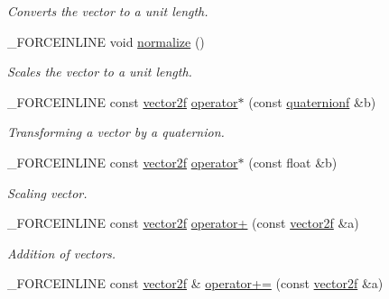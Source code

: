 \begin{DoxyCompactItemize}
\begin{DoxyCompactList}\small\item\em Converts the vector to a unit length. \end{DoxyCompactList}\item 
\hypertarget{classbt_1_1vector2f_aefdfbe4a6dcecf8a2443aa914f344a04}{\-\_\-\-F\-O\-R\-C\-E\-I\-N\-L\-I\-N\-E void \hyperlink{classbt_1_1vector2f_aefdfbe4a6dcecf8a2443aa914f344a04}{normalize} ()}\label{classbt_1_1vector2f_aefdfbe4a6dcecf8a2443aa914f344a04}

\begin{DoxyCompactList}\small\item\em Scales the vector to a unit length. \end{DoxyCompactList}\item 
\hypertarget{classbt_1_1vector2f_a381ee7f7b1b027682ee0708d9aaf08d7}{\-\_\-\-F\-O\-R\-C\-E\-I\-N\-L\-I\-N\-E const \hyperlink{classbt_1_1vector2f}{vector2f} \hyperlink{classbt_1_1vector2f_a381ee7f7b1b027682ee0708d9aaf08d7}{operator$\ast$} (const \hyperlink{classbt_1_1quaternionf}{quaternionf} \&b)}\label{classbt_1_1vector2f_a381ee7f7b1b027682ee0708d9aaf08d7}

\begin{DoxyCompactList}\small\item\em Transforming a vector by a quaternion. \end{DoxyCompactList}\item 
\hypertarget{classbt_1_1vector2f_aa389b9e307ab16ba50c1c1b885a4b498}{\-\_\-\-F\-O\-R\-C\-E\-I\-N\-L\-I\-N\-E const \hyperlink{classbt_1_1vector2f}{vector2f} \hyperlink{classbt_1_1vector2f_aa389b9e307ab16ba50c1c1b885a4b498}{operator$\ast$} (const float \&b)}\label{classbt_1_1vector2f_aa389b9e307ab16ba50c1c1b885a4b498}

\begin{DoxyCompactList}\small\item\em Scaling vector. \end{DoxyCompactList}\item 
\hypertarget{classbt_1_1vector2f_a1b2a8cfec3fa8a59348a8c1b663931c3}{\-\_\-\-F\-O\-R\-C\-E\-I\-N\-L\-I\-N\-E const \hyperlink{classbt_1_1vector2f}{vector2f} \hyperlink{classbt_1_1vector2f_a1b2a8cfec3fa8a59348a8c1b663931c3}{operator+} (const \hyperlink{classbt_1_1vector2f}{vector2f} \&a)}\label{classbt_1_1vector2f_a1b2a8cfec3fa8a59348a8c1b663931c3}

\begin{DoxyCompactList}\small\item\em Addition of vectors. \end{DoxyCompactList}\item 
\hypertarget{classbt_1_1vector2f_af8e2c98742a3ac873f4c0269a0ce1762}{\-\_\-\-F\-O\-R\-C\-E\-I\-N\-L\-I\-N\-E const \hyperlink{classbt_1_1vector2f}{vector2f} \& \hyperlink{classbt_1_1vector2f_af8e2c98742a3ac873f4c0269a0ce1762}{operator+=} (const \hyperlink{classbt_1_1vector2f}{vector2f} \&a)}\label{classbt_1_1vector2f_af8e2c98742a3ac873f4c0269a0ce1762}


\end{DoxyCompactItemize}
